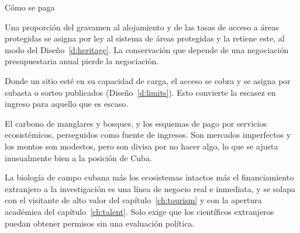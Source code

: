 \begin{design}{Cómo se paga}
\label{d:natfinance}
\begin{rules}
 Una proporción del gravamen al alojamiento y de las tasas de
acceso a áreas protegidas se asigna por ley al sistema de áreas protegidas y la retiene este, al
modo del Diseño~\ref{d:heritage}. La conservación que depende de una negociación presupuestaria
anual pierde la negociación.

 Donde un sitio esté en su capacidad de carga, el acceso se cobra y
se asigna por subasta o sorteo publicados (Diseño~\ref{d:limits}). Esto convierte la escasez en
ingreso para aquello que es escaso.

 El carbono de manglares y bosques, y los esquemas de pago
por servicios ecosistémicos, perseguidos como fuente de ingresos. Son mercados imperfectos y los
montos son modestos, pero son divisa por no hacer algo, lo que se ajusta inusualmente bien a la
posición de Cuba.

 La biología de campo cubana más los ecosistemas intactos más
el financiamiento extranjero a la investigación es una línea de negocio real e inmediata, y se
solapa con el visitante de alto valor del capítulo~\ref{ch:tourism} y con la apertura académica del
capítulo~\ref{ch:talent}. Solo exige que los científicos extranjeros puedan obtener permisos sin
una evaluación política.
\end{rules}
\end{design}

